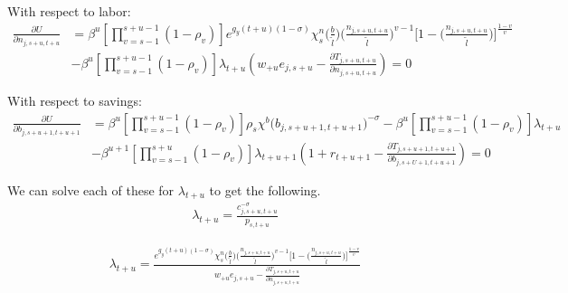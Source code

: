     With respect to labor:
    \begin{equation}\label{Eqnfoc}
      \begin{split}
      \frac{\partial U}{\partial n_{j,s+u,t+u}} & = \beta^u\left[\prod_{v=s-1}^{s+u-1}(1-\rho_v)\right] e^{g_y (t+u)(1-\sigma)}\chi^n_{s}\biggl(\frac{b}{\tilde{l}}\biggr)\biggl(\frac{n_{j,s+u,t+u}}{\tilde{l}}\biggr)^{v-1}\Biggl[1 - \biggl(\frac{n_{j,s+u,t+u}}{\tilde{l}}\biggr)\Biggr]^{\frac{1-v}{v}} \\
      & -  \beta^u\left[\prod_{v=s-1}^{s+u-1}(1-\rho_v)\right]\lambda_{t+u} \left( w_{+u} e_{j,s+u} - \frac{\partial T_{j,s+u,t+u}}{\partial n_{j,s+u,t+u}} \right)= 0
        \end{split}
    \end{equation}

    With respect to savings:
    \begin{equation}\label{Eqbfoc}
      \begin{split}
      \frac{\partial U}{\partial b_{j,s+u+1,t+u+1}} & = \beta^u\left[\prod_{v=s-1}^{s+u-1}(1-\rho_v)\right] \rho_s\chi^b\bigl(b_{j,s+u+1,t+u+1}\bigr)^{-\sigma} - \beta^u\left[\prod_{v=s-1}^{s+u-1}(1-\rho_v)\right] \lambda_{t+u}  \\\ & - \beta^{u+1}\left[\prod_{v=s-1}^{s+u}(1-\rho_v)\right] \lambda_{t+u+1} \left( 1 + r_{t+u+1} - \frac{\partial T_{j,s+u+1,t+u+1}}{\partial b_{j,s+U+1,t+u+1}} \right)= 0
      \end{split}
    \end{equation}

    We can solve each of these for $\lambda_{t+u}$ to get the following.
    \begin{equation}
      \begin{split}
      \lambda_{t+u} = \frac{c_{j,s+u,t+u}^{-\sigma}}{ p_{s,t+u}} \nonumber
      \end{split}
    \end{equation}

    \begin{equation}
      \begin{split}
      \lambda_{t+u} = \frac{e^{g_y (t+u)(1-\sigma)}\chi^n_{s}\biggl(\frac{b}{\tilde{l}}\biggr)\biggl(\frac{n_{j,s+u,t+u}}{\tilde{l}}\biggr)^{v-1}\Biggl[1 - \biggl(\frac{n_{j,s+u,t+u}}{\tilde{l}}\biggr)\Biggr]^{\frac{1-v}{v}}}{ w_{+u} e_{j,s+u} - \frac{\partial T_{j,s+u,t+u}}{\partial n_{j,s+u,t+u}} }  \nonumber
      \end{split}
    \end{equation}

